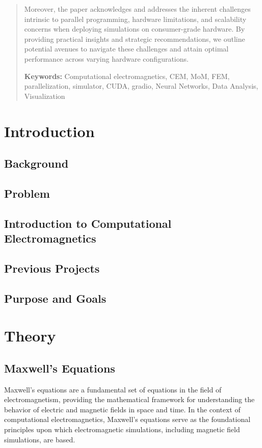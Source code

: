 \documentclass[11pt, a4paper, titlepage]{article}
\begin{document}
\begin{abstract}
	Moreover, the paper acknowledges and addresses the inherent challenges intrinsic to parallel programming, hardware limitations, and scalability concerns when deploying simulations on consumer-grade hardware. By providing practical insights and strategic recommendations, we outline potential avenues to navigate these challenges and attain optimal performance across varying hardware configurations.
	\begin{flushleft}
		{\small {\bf Keywords:} Computational electromagnetics, CEM, MoM, FEM, parallelization, simulator, CUDA, gradio, Neural Networks, Data Analysis, Visualization}
	\end{flushleft}
	
\end{abstract}
\setcounter{page}{2}
\tableofcontents
\newpage

\section{Introduction}
\subsection{Background}
\subsection{Problem}
\subsection{Introduction to Computational Electromagnetics}
\subsection{Previous Projects}
\subsection{Purpose and Goals}
\newpage




\section{Theory}
\subsection{Maxwell's Equations}

Maxwell's equations are a fundamental set of equations in the field of electromagnetism, providing the mathematical framework for understanding the behavior of electric and magnetic fields in space and time. In the context of computational electromagnetics, Maxwell's equations serve as the foundational principles upon which electromagnetic simulations, including magnetic field simulations, are based.
\end{document}
